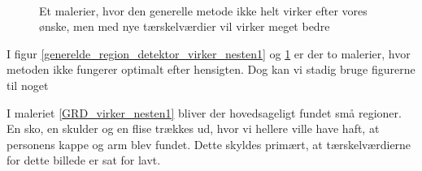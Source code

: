 \begin{figure}[!h]
    \centering
    \\
	\hspace{1em}
     \caption[]{Et malerier, hvor den generelle metode ikke helt virker efter vores ønske, men med nye tærskelværdier vil virker meget bedre}
     \label{generelde_region_detektor_virker_nesten2}
\end{figure}

I figur \ref{generelde_region_detektor_virker_nesten1} og \ref{generelde_region_detektor_virker_nesten2} er der to
malerier, hvor metoden ikke fungerer optimalt efter hensigten. Dog kan
vi stadig bruge figurerne til noget

I maleriet \ref{GRD_virker_nesten1} bliver der hovedsageligt fundet små
regioner. En sko, en skulder og en flise trækkes ud, hvor vi hellere
ville have haft, at personens kappe og arm blev fundet. Dette skyldes
primært, at tærskelværdierne for dette billede er sat for lavt. 


